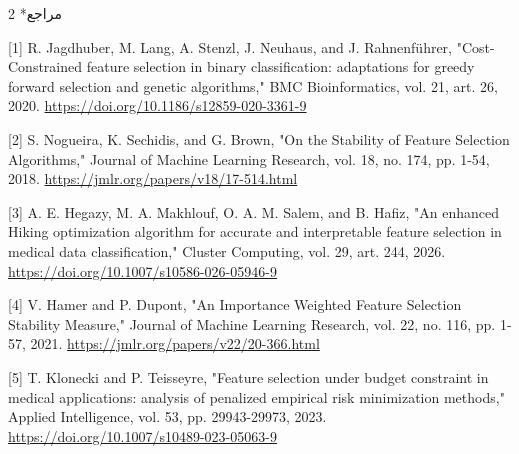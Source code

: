 \documentclass[10pt,a4paper]{article}
\makeatletter
\renewcommand{\section}{\@startsection{section}{1}{0pt}{5pt}{2pt}{\normalfont\normalsize\bfseries}}
\newcommand{\sect}[1]{\section*{#1}}
\makeatother
\begin{document}
\begin{multicols}{2}
\sect{مراجع}
\begin{minipage}{\linewidth}{\fontsize{7}{8.2}\selectfont \begin{latin}[1] R. Jagdhuber, M. Lang, A. Stenzl, J. Neuhaus, and J. Rahnenführer, "Cost-Constrained feature selection in binary classification: adaptations for greedy forward selection and genetic algorithms," BMC Bioinformatics, vol. 21, art. 26, 2020. \url{https://doi.org/10.1186/s12859-020-3361-9}\end{latin}\par}\end{minipage}\par
\begin{minipage}{\linewidth}{\fontsize{7}{8.2}\selectfont \begin{latin}[2] S. Nogueira, K. Sechidis, and G. Brown, "On the Stability of Feature Selection Algorithms," Journal of Machine Learning Research, vol. 18, no. 174, pp. 1-54, 2018. \url{https://jmlr.org/papers/v18/17-514.html}\end{latin}\par}\end{minipage}\par
\begin{minipage}{\linewidth}{\fontsize{7}{8.2}\selectfont \begin{latin}[3] A. E. Hegazy, M. A. Makhlouf, O. A. M. Salem, and B. Hafiz, "An enhanced Hiking optimization algorithm for accurate and interpretable feature selection in medical data classification," Cluster Computing, vol. 29, art. 244, 2026. \url{https://doi.org/10.1007/s10586-026-05946-9}\end{latin}\par}\end{minipage}\par
\begin{minipage}{\linewidth}{\fontsize{7}{8.2}\selectfont \begin{latin}[4] V. Hamer and P. Dupont, "An Importance Weighted Feature Selection Stability Measure," Journal of Machine Learning Research, vol. 22, no. 116, pp. 1-57, 2021. \url{https://jmlr.org/papers/v22/20-366.html}\end{latin}\par}\end{minipage}\par
\begin{minipage}{\linewidth}{\fontsize{7}{8.2}\selectfont \begin{latin}[5] T. Klonecki and P. Teisseyre, "Feature selection under budget constraint in medical applications: analysis of penalized empirical risk minimization methods," Applied Intelligence, vol. 53, pp. 29943-29973, 2023. \url{https://doi.org/10.1007/s10489-023-05063-9}\end{latin}\par}\end{minipage}\par

\end{multicols}
\end{document}

